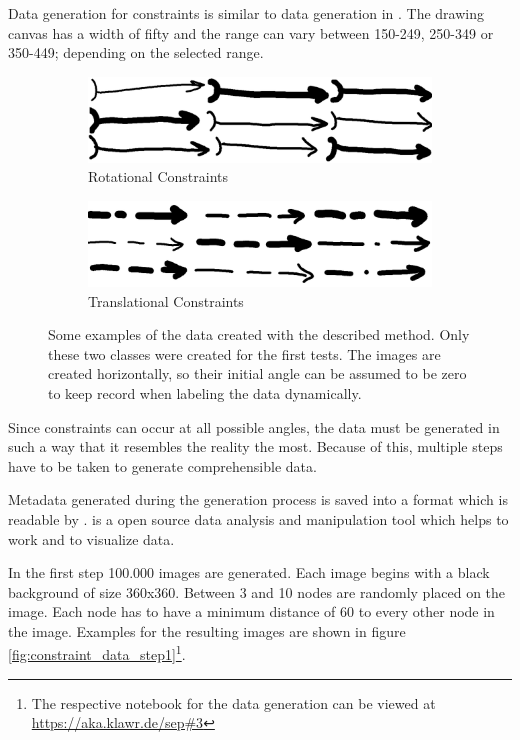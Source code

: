 Data generation for constraints is similar to data generation in \cite{Lawrence2020}.
The drawing canvas has a width of fifty and the range can vary between 150-249, 250-349 or 350-449; depending on the selected range.

\begin{figure}
    \centering
    \begin{subfigure}[b]{0.45\textwidth}
        \includegraphics[width=\textwidth]{images/rs.png}
        \caption{Rotational Constraints}
        \label{fig:rotational_constraints}
    \end{subfigure}
    \begin{subfigure}[b]{0.45\textwidth}
        \includegraphics[width=\textwidth]{images/ts.png}
        \caption{Translational Constraints}
        \label{fig:translational_constraints}
    \end{subfigure}
    \caption{Some examples of the data created with the described method. Only these two classes were created for the first tests. The images are created horizontally, so their initial angle can be assumed to be zero to keep record when labeling the data dynamically. }
    \label{fig:generated_data_samples}
\end{figure}

Since constraints can occur at all possible angles, the data must be generated in such a way that it resembles the reality the most.
Because of this, multiple steps have to be taken to generate comprehensible data.

Metadata generated during the generation process is saved into a format which is readable by . %
 is a open source data analysis and manipulation tool which helps to work and to visualize data.

In the first step 100.000 images are generated.
Each image begins with a black background of size 360x360.
Between 3 and 10 nodes are randomly placed on the image.
Each node has to have a minimum distance of 60 to every other node in the image.
Examples for the resulting images are shown in figure \ref{fig:constraint_data_step1}\footnote{The respective notebook for the data generation can be viewed at \url{https://aka.klawr.de/sep\#3}}.

